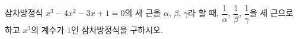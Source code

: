삼차방정식 $x^3-4x^2-3x+1=0$의 세 근을 $\alpha$, $\beta$, $\gamma$라 할 때, $\dfrac{1}{\alpha}$, $\dfrac{1}{\beta}$, $\dfrac{1}{\gamma}$을 세 근으로 하고 $x^3$의 계수가 $1$인 삼차방정식을 구하시오.
